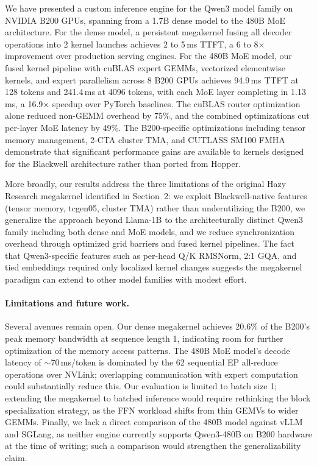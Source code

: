 \documentclass[sigplan,screen]{acmart}
\begin{document}
We have presented a custom inference engine for the Qwen3 model family on NVIDIA B200 GPUs, spanning from a 1.7B dense model to the 480B MoE architecture. For the dense model, a persistent megakernel fusing all decoder operations into 2 kernel launches achieves 2 to 5\,ms TTFT, a 6 to 8$\times$ improvement over production serving engines. For the 480B MoE model, our fused kernel pipeline with cuBLAS expert GEMMs, vectorized elementwise kernels, and expert parallelism across 8 B200 GPUs achieves 94.9\,ms TTFT at 128 tokens and 241.4\,ms at 4096 tokens, with each MoE layer completing in 1.13\,ms, a 16.9$\times$ speedup over PyTorch baselines. The cuBLAS router optimization alone reduced non-GEMM overhead by 75\%, and the combined optimizations cut per-layer MoE latency by 49\%. The B200-specific optimizations including tensor memory management, 2-CTA cluster TMA, and CUTLASS SM100 FMHA demonstrate that significant performance gains are available to kernels designed for the Blackwell architecture rather than ported from Hopper.

More broadly, our results address the three limitations of the original Hazy Research megakernel identified in Section~2: we exploit Blackwell-native features (tensor memory, tcgen05, cluster TMA) rather than underutilizing the B200, we generalize the approach beyond Llama-1B to the architecturally distinct Qwen3 family including both dense and MoE models, and we reduce synchronization overhead through optimized grid barriers and fused kernel pipelines. The fact that Qwen3-specific features such as per-head Q/K RMSNorm, 2:1 GQA, and tied embeddings required only localized kernel changes suggests the megakernel paradigm can extend to other model families with modest effort.

\paragraph{Limitations and future work.}
Several avenues remain open. Our dense megakernel achieves 20.6\% of the B200's peak memory bandwidth at sequence length 1, indicating room for further optimization of the memory access patterns. The 480B MoE model's decode latency of ${\sim}$70\,ms/token is dominated by the 62 sequential EP all-reduce operations over NVLink; overlapping communication with expert computation could substantially reduce this. Our evaluation is limited to batch size 1; extending the megakernel to batched inference would require rethinking the block specialization strategy, as the FFN workload shifts from thin GEMVs to wider GEMMs. Finally, we lack a direct comparison of the 480B model against vLLM and SGLang, as neither engine currently supports Qwen3-480B on B200 hardware at the time of writing; such a comparison would strengthen the generalizability claim.



\end{document}
